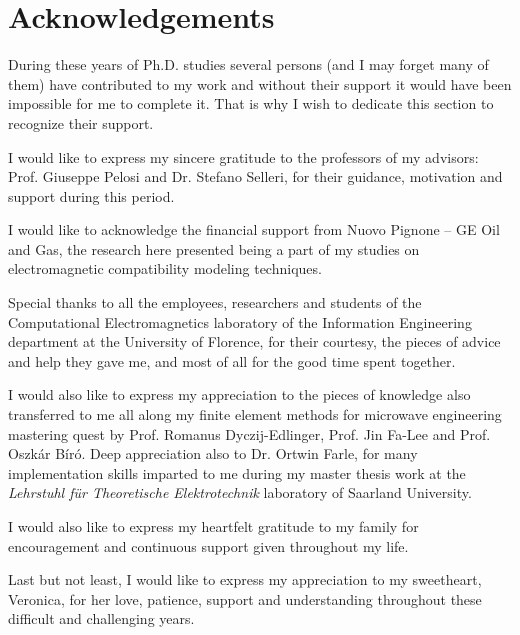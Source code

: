 \chapter*{Acknowledgements}

During these years of Ph.D. studies several persons (and I may forget many of them) have contributed to my work and without their support it would have been impossible for me to complete it. That is why I wish to dedicate this section to recognize their support.

I would like to express my sincere gratitude to the professors of my advisors: Prof. Giuseppe Pelosi and Dr. Stefano Selleri, for their guidance, motivation and support during this period.

I would like to acknowledge the financial support from Nuovo Pignone -- GE Oil and Gas, the research here presented being a part of my studies on electromagnetic compatibility modeling techniques.

Special thanks to all the employees, researchers and students of the Computational Electromagnetics laboratory of the Information Engineering department at the University of Florence, for their courtesy, the pieces of advice and help they gave me, and most of all for the good time spent together.

I would also like to express my appreciation to the pieces of knowledge also transferred to me all along my finite element methods for microwave engineering mastering quest by Prof. Romanus Dyczij-Edlinger, Prof. Jin Fa-Lee and Prof. Oszk\'ar B\'ir\'o. Deep appreciation also to Dr. Ortwin Farle, for many implementation skills imparted to me during my master thesis work at the \textit{Lehrstuhl f\"ur Theoretische Elektrotechnik} laboratory of Saarland University.

I would also like to express my heartfelt gratitude to my family for encouragement
and continuous support given throughout my life.

Last but not least, I would like to express my appreciation to my sweetheart, Veronica, for her love, patience, support and understanding throughout these difficult and challenging years.